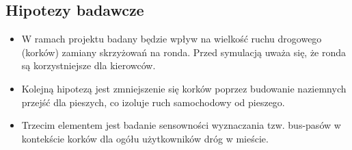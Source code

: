 \documentclass{article}
\begin{document}
\subsection{Hipotezy badawcze}
\begin{itemize}
    \item W ramach projektu badany będzie wpływ na wielkość ruchu drogowego (korków) zamiany skrzyżowań na ronda. Przed symulacją uważa się, że ronda są korzystniejsze dla kierowców.

    \item Kolejną hipotezą jest zmniejszenie się korków poprzez budowanie naziemnych przejść dla pieszych, co izoluje ruch samochodowy od pieszego.

    \item Trzecim elementem jest badanie sensowności wyznaczania tzw. bus-pasów w kontekście korków dla ogółu użytkowników dróg w mieście.
\end{itemize}
\end{document}
